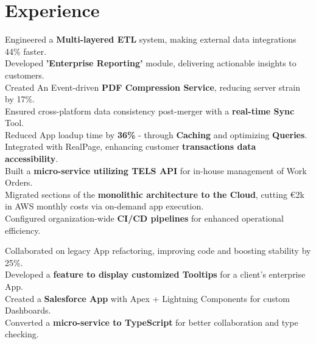 \documentclass[]{deedy-resume-openfont}
\begin{document}
\begin{minipage}[t]{0.66\textwidth} 

\section{Experience}
\vspace{1pt}
\vspace{2pt}
\textbullet{} Engineered a \textbf{Multi-layered ETL} system, making external data integrations 44\% faster.\\
\textbullet{} Developed \textbf{'Enterprise Reporting'} module, delivering actionable insights to customers. \\
\textbullet{} Created An Event-driven \textbf{PDF Compression Service}, reducing server strain by 17\%. \\
\textbullet{} Ensured cross-platform data consistency post-merger with a \textbf{real-time Sync} Tool. \\
\textbullet{} Reduced App loadup time by \textbf{36\%} - through \textbf{Caching} and optimizing \textbf{Queries}. \\
\textbullet{} Integrated with RealPage, enhancing customer \textbf{transactions data accessibility}. \\
\textbullet{} Built a \textbf{micro-service utilizing TELS API} for in-house management of Work Orders. \\
\textbullet{} Migrated sections of the \textbf{monolithic architecture to the Cloud}, cutting €2k in AWS monthly costs via on-demand app execution. \\
\textbullet{} Configured organization-wide \textbf{CI/CD pipelines} for enhanced operational efficiency.
\sectionsep

\vspace{1pt}
\vspace{2pt}
\textbullet{} Collaborated on legacy App refactoring, improving code and boosting stability by 25\%. \\ 
\textbullet{} Developed a \textbf{feature to display customized Tooltips} for a client's enterprise App. \\
\textbullet{} Created a \textbf{Salesforce App} with Apex + Lightning Components for custom Dashboards. \\
\textbullet{} Converted a \textbf{micro-service to TypeScript} for better collaboration and type checking.
\sectionsep


\end{minipage}
\end{document}
